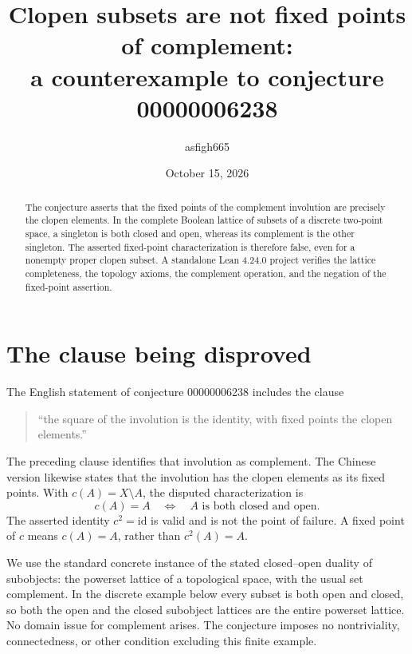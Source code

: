 \documentclass[10pt,a4paper]{article}
\title{Clopen subsets are not fixed points of complement:\\
a counterexample to conjecture 00000006238}
\author{asfigh665}
\date{October 15, 2026}
\begin{document}
\maketitle

\begin{abstract}
The conjecture asserts that the fixed points of the complement involution
are precisely the clopen elements. In the complete Boolean lattice of
subsets of a discrete two-point space, a singleton is both closed and open,
whereas its complement is the other singleton. The asserted fixed-point
characterization is therefore false, even for a nonempty proper clopen
subset. A standalone Lean 4.24.0 project verifies the lattice completeness,
the topology axioms, the complement operation, and the negation of the
fixed-point assertion.
\end{abstract}

\section{The clause being disproved}
The English statement of conjecture 00000006238 includes the clause
\begin{quote}
``the square of the involution is the identity, with fixed points the
clopen elements.''
\end{quote}
The preceding clause identifies that involution as complement. The Chinese
version likewise states that the involution has the clopen elements as its
fixed points. With $c(A)=X\setminus A$, the disputed characterization is
\begin{equation}\label{eq:claim}
 c(A)=A\quad\Longleftrightarrow\quad
 A\text{ is both closed and open}.
\end{equation}
The asserted identity $c^2=\mathrm{id}$ is valid and is not the point of
failure. A fixed point of $c$ means $c(A)=A$, rather than $c^2(A)=A$.

We use the standard concrete instance of the stated closed--open duality
of subobjects: the powerset lattice of a topological space, with the
usual set complement. In the discrete example below every subset is both
open and closed, so both the open and the closed subobject lattices are
the entire powerset lattice. No domain issue for complement arises.
The conjecture imposes no nontriviality, connectedness, or other condition
excluding this finite example.
\end{document}
